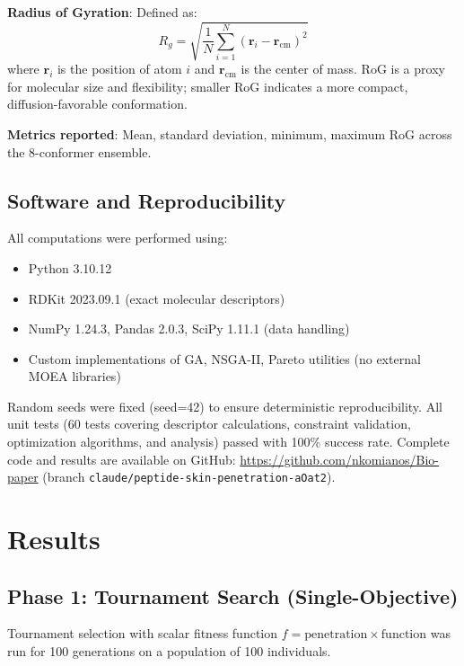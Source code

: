\documentclass[11pt,a4paper]{article}
\begin{document}
\textbf{Radius of Gyration}: Defined as:
\begin{equation}
R_g = \sqrt{\frac{1}{N} \sum_{i=1}^{N} (\mathbf{r}_i - \mathbf{r}_{\text{cm}})^2}
\end{equation}
where $\mathbf{r}_i$ is the position of atom $i$ and $\mathbf{r}_{\text{cm}}$ is the center of mass. RoG is a proxy for molecular size and flexibility; smaller RoG indicates a more compact, diffusion-favorable conformation.

\textbf{Metrics reported}: Mean, standard deviation, minimum, maximum RoG across the 8-conformer ensemble.

\subsection{Software and Reproducibility}

All computations were performed using:
\begin{itemize}
  \item Python 3.10.12
  \item RDKit 2023.09.1 (exact molecular descriptors)
  \item NumPy 1.24.3, Pandas 2.0.3, SciPy 1.11.1 (data handling)
  \item Custom implementations of GA, NSGA-II, Pareto utilities (no external MOEA libraries)
\end{itemize}

Random seeds were fixed (seed=42) to ensure deterministic reproducibility. All unit tests (60 tests covering descriptor calculations, constraint validation, optimization algorithms, and analysis) passed with 100\% success rate. Complete code and results are available on GitHub: \url{https://github.com/nkomianos/Bio-paper} (branch \texttt{claude/peptide-skin-penetration-aOat2}).

\section{Results}

\subsection{Phase 1: Tournament Search (Single-Objective)}

Tournament selection with scalar fitness function $f = \text{penetration} \times \text{function}$ was run for 100 generations on a population of 100 individuals.
\end{document}
